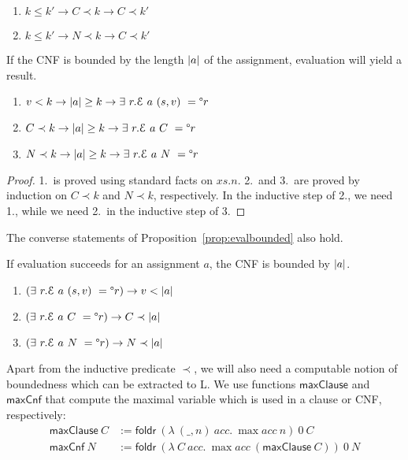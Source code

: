 \documentclass[a4paper,UKenglish,cleveref, autoref]{lipics-v2019}
\begin{document}
\begin{proposition}\label{prop:varboundmono}\leavevmode
  \begin{enumerate}
    \item $k \le k' \rightarrow C \prec k \rightarrow C \prec k'$
    \item $k \le k' \rightarrow N \prec k \rightarrow C \prec k'$
  \end{enumerate}
\end{proposition}

\begin{proposition}\label{prop:evalbounded}
  If the CNF is bounded by the length $|a|$ of the assignment, evaluation will yield a result.
  \begin{enumerate}
    \item $v < k \rightarrow |a| \ge k \rightarrow \exists~r. \mathcal{E}~a~(s, v)~ = \degree r$
    \item $C \prec k \rightarrow |a| \ge k \rightarrow \exists~r. \mathcal{E}~a~C~ = \degree r$
    \item $N \prec k \rightarrow |a| \ge k \rightarrow \exists~r. \mathcal{E}~a~N~ = \degree r$
  \end{enumerate}
\end{proposition}
\begin{proof}
  1.\ is proved using standard facts on $xs.n$. 2.\ and 3.\ are proved by induction on $C \prec k$ and $N \prec k$, respectively. In the inductive step of 2., we need 1., while we need 2.\ in the inductive step of 3.
\end{proof}
  
The converse statements of Proposition~\ref{prop:evalbounded} also hold.

\begin{proposition}\label{prop:boundedeval}
  If evaluation succeeds for an assignment $a$, the CNF is bounded by $|a|$. 
  \begin{enumerate}
    \item $(\exists~r. \mathcal{E}~a~(s, v)~ = \degree r) \rightarrow v < |a|$
    \item $(\exists~r. \mathcal{E}~a~C~ = \degree r) \rightarrow C \prec |a|$
    \item $(\exists~r. \mathcal{E}~a~N~ = \degree r) \rightarrow N \prec |a|$
  \end{enumerate}
\end{proposition}

Apart from the inductive predicate $\prec$, we will also need a computable notion of boundedness which can be extracted to L. We use functions $\textsf{maxClause}$ and $\textsf{maxCnf}$ that compute the maximal variable which is used in a clause or CNF, respectively: 
\begin{align*}
  \textsf{maxClause}~C &:= \textsf{foldr}~(\lambda~(\_, n)~acc.~\max acc~n)~0~C \\
  \textsf{maxCnf}~N &:= \textsf{foldr}~(\lambda~C~acc.~\max acc~(\textsf{maxClause}~C))~0~N
\end{align*}
\end{document}
